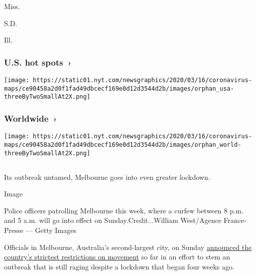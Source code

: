 \href{https://www.nytimes.com/interactive/2020/us/mississippi-coronavirus-cases.html}{}

Miss.

\href{https://www.nytimes.com/interactive/2020/us/south-dakota-coronavirus-cases.html}{}

S.D.

\href{https://www.nytimes.com/interactive/2020/us/illinois-coronavirus-cases.html}{}

Ill.

\href{https://www.nytimes.com/interactive/2020/us/coronavirus-us-cases.html}{}

\hypertarget{us-hot-spots-}{%
\subsubsection{U.S. hot spots~›}\label{us-hot-spots-}}

\texttt{[image: https://static01.nyt.com/newsgraphics/2020/03/16/coronavirus-maps/ce90458a2d0f1fad49dbcecf169e0d12d3544d2b/images/orphan\_usa-threeByTwoSmallAt2X.png]}

\href{https://www.nytimes.com/interactive/2020/world/coronavirus-maps.html}{}

\hypertarget{worldwide-}{%
\subsubsection{Worldwide~›}\label{worldwide-}}

\texttt{[image: https://static01.nyt.com/newsgraphics/2020/03/16/coronavirus-maps/ce90458a2d0f1fad49dbcecf169e0d12d3544d2b/images/orphan\_world-threeByTwoSmallAt2X.png]}

\hypertarget{-2}{%
\subsection{}\label{-2}}

Its outbreak untamed, Melbourne goes into even greater lockdown.

Image

Police officers patrolling Melbourne this week, where a curfew between 8
p.m. and 5 a.m. will go into effect on Sunday.Credit...William
West/Agence France-Presse --- Getty Images

Officials in Melbourne, Australia's second-largest city, on Sunday
\href{https://www.premier.vic.gov.au/statement-changes-melbournes-restrictions}{announced
the country's strictest restrictions on movement} so far in an effort to
stem an outbreak that is still raging despite a lockdown that began four
weeks ago.

